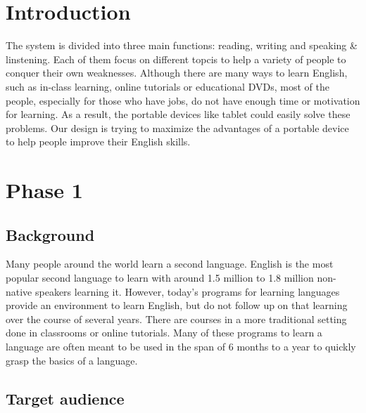 \documentclass{sigchi}
\begin{document}


\section{Introduction}

The system is divided into  three main functions: reading, writing and speaking & linstening. Each 
of them  focus on different topcis to help a variety of people to conquer their own weaknesses. 
Although there are many ways to learn English, such as in-class learning, online tutorials or 
educational DVDs, most of the people, especially for those who have jobs, do not have enough time 
or motivation for learning. As a result, the portable devices like tablet could easily solve these 
problems. Our design is trying to maximize the advantages of a portable device to help people improve 
their English skills.

\section{Phase 1}

\subsection{Background}

Many people around the world learn a second language. English is the most 
popular second language to learn with around 1.5 million to 1.8 million 
non-native speakers learning it. However, today’s programs for learning 
languages provide an environment to learn English, but do not follow up on that 
learning over the course of several years. There are courses in a more 
traditional setting done in classrooms or online tutorials. Many of these 
programs to learn a language are often meant to be used in the span of 6 months 
to a year to quickly grasp the basics of a language.

\subsection{Target audience}
\end{document}
